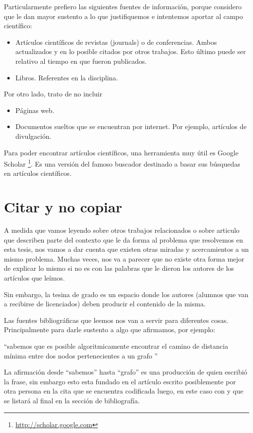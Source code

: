 Particularmente prefiero las siguientes fuentes de información, porque considero que le dan mayor sustento a lo que justifiquemos e intentemos aportar al campo científico:
\begin{itemize}
    \item Artículos científicos de revistas (journals) o de conferencias. Ambos actualizados y en lo posible citados por otros trabajos. Esto último puede ser relativo al tiempo en que fueron publicados. 
    \item Libros. Referentes en la disciplina.
\end{itemize}

Por otro lado, trato de no incluir
\begin{itemize}
    \item Páginas web.
    \item Documentos sueltos que se encuentran por internet. Por ejemplo, artículos de divulgación.
\end{itemize}

Para poder encontrar artículos científicos, una herramienta muy útil es Google Scholar \footnote{\url{http://scholar.google.com}}. Es una versión del famoso buscador destinado a basar sus búsquedas en artículos científicos. 


\section{Citar y no copiar}

A medida que vamos leyendo sobre otros trabajos relacionados o sobre articulo que describen parte del contexto que le da forma al problema que resolvemos en esta tesis, nos vamos a dar cuenta que existen otras miradas y acercamientos a un mismo problema. Muchas veces, nos va a parecer que no existe otra forma mejor de explicar lo mismo si no es con las palabras que le dieron los autores de los artículos que leímos. 

Sin embargo, la tesina de grado es un espacio donde los autores (alumnos que van a recibirse de licenciados) deben producir el contenido de la misma. 

Las fuentes bibliográficas que leemos nos van a servir para diferentes cosas. Principalmente para darle sustento a algo que afirmamos, por ejemplo:

``sabemos que es posible algoritmicamente encontrar el camino de distancia mínima entre dos nodos pertenecientes a un grafo \cite{dijkstra1959note}''

La afirmación desde ``sabemos'' hasta ``grafo'' es una producción de quien escribió la frase, sin embargo esto esta fundado en el artículo escrito posiblemente por otra persona en la cita que se encuentra codificada luego, en este caso con \cite{dijkstra1959note} y que se listará al final en la sección de bibliografía.